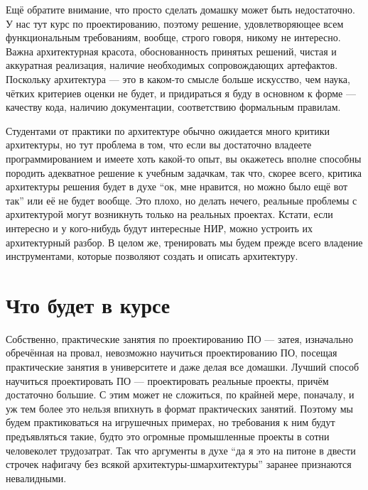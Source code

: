 \documentclass[a5paper]{article}
\begin{document}
Ещё обратите внимание, что просто сделать домашку может быть недостаточно. У нас тут курс по проектированию, поэтому решение, удовлетворяющее всем функциональным требованиям, вообще, строго говоря, никому не интересно. Важна архитектурная красота, обоснованность принятых решений, чистая и аккуратная реализация, наличие необходимых сопровождающих артефактов. Поскольку архитектура --- это в каком-то смысле больше искусство, чем наука, чётких критериев оценки не будет, и придираться я буду в основном к форме --- качеству кода, наличию документации, соответствию формальным правилам. 

Студентами от практики по архитектуре обычно ожидается много критики архитектуры, но тут проблема в том, что если вы достаточно владеете программированием и имеете хоть какой-то опыт, вы окажетесь вполне способны породить адекватное решение к учебным задачкам, так что, скорее всего, критика архитектуры решения будет в духе ``ок, мне нравится, но можно было ещё вот так'' или её не будет вообще. Это плохо, но делать нечего, реальные проблемы с архитектурой могут возникнуть только на реальных проектах. Кстати, если интересно и у кого-нибудь будут интересные НИР, можно устроить их архитектурный разбор. В целом же, тренировать мы будем прежде всего владение инструментами, которые позволяют создать и описать архитектуру.

\section{Что будет в курсе}
Собственно, практические занятия по проектированию ПО --- затея, изначально обречённая на провал, невозможно научиться проектированию ПО, посещая практические занятия в университете и даже делая все домашки. Лучший способ научиться проектировать ПО --- проектировать реальные проекты, причём достаточно большие. С этим может не сложиться, по крайней мере, поначалу, и уж тем более это нельзя впихнуть в формат практических занятий. Поэтому мы будем практиковаться на игрушечных примерах, но требования к ним будут предъявляться такие, будто это огромные промышленные проекты в сотни человеколет трудозатрат. Так что аргументы в духе ``да я это на питоне в двести строчек нафигачу без всякой архитектуры-шмархитектуры'' заранее признаются невалидными. 
\end{document}
